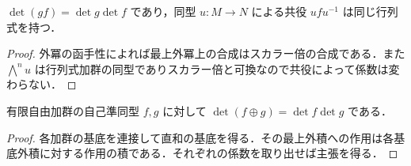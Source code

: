 \begin{prop}[行列式の乗法性と共役不変性]
$\det(gf)=\det g\det f$ であり，同型 $u:M\to N$ による共役 $ufu^{-1}$ は同じ行列式を持つ．
\end{prop}
\begin{proof}
外冪の函手性によれば最上外冪上の合成はスカラー倍の合成である．また $\bigwedge^n u$ は行列式加群の同型でありスカラー倍と可換なので共役によって係数は変わらない．
\end{proof}
\begin{prop}[直和の行列式]
有限自由加群の自己準同型 $f,g$ に対して $\det(f\oplus g)=\det f\det g$ である．
\end{prop}
\begin{proof}
各加群の基底を連接して直和の基底を得る．その最上外積への作用は各基底外積に対する作用の積である．それぞれの係数を取り出せば主張を得る．
\end{proof}
